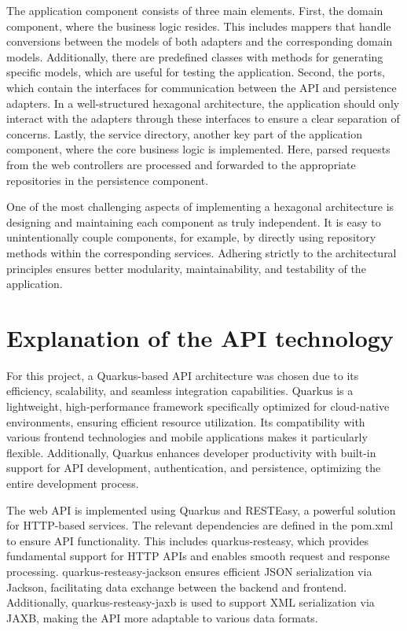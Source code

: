 \documentclass[a4paper, 11pt]{article}
\begin{document}
The application component consists of three main elements. First, the domain component, where the business logic resides. This includes mappers that handle conversions between the models of both adapters and the corresponding domain models. Additionally, there are predefined classes with methods for generating specific models, which are useful for testing the application. Second, the ports, which contain the interfaces for communication between the API and persistence adapters. In a well-structured hexagonal architecture, the application should only interact with the adapters through these interfaces to ensure a clear separation of concerns. Lastly, the service directory, another key part of the application component, where the core business logic is implemented. Here, parsed requests from the web controllers are processed and forwarded to the appropriate repositories in the persistence component.


One of the most challenging aspects of implementing a hexagonal architecture is designing and maintaining each component as truly independent. It is easy to unintentionally couple components, for example, by directly using repository methods within the corresponding services. Adhering strictly to the architectural principles ensures better modularity, maintainability, and testability of the application.


\section{Explanation of the API technology} \label{sec:explanation-of-the-api-technology}
For this project, a Quarkus-based API architecture was chosen due to its efficiency, scalability, and seamless integration capabilities. Quarkus is a lightweight, high-performance framework specifically optimized for cloud-native environments, ensuring efficient resource utilization. Its compatibility with various frontend technologies and mobile applications makes it particularly flexible. Additionally, Quarkus enhances developer productivity with built-in support for API development, authentication, and persistence, optimizing the entire development process.

The web API is implemented using Quarkus and RESTEasy, a powerful solution for HTTP-based services. The relevant dependencies are defined in the pom.xml to ensure API functionality. This includes quarkus-resteasy, which provides fundamental support for HTTP APIs and enables smooth request and response processing. quarkus-resteasy-jackson ensures efficient JSON serialization via Jackson, facilitating data exchange between the backend and frontend. Additionally, quarkus-resteasy-jaxb is used to support XML serialization via JAXB, making the API more adaptable to various data formats.
\end{document}
